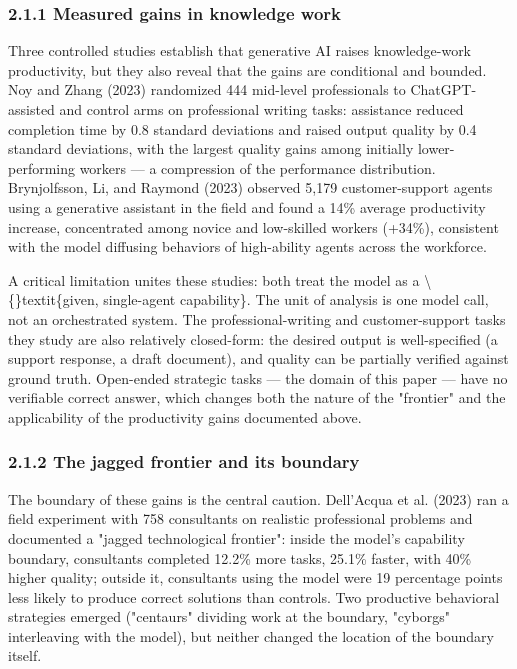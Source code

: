 \documentclass[11pt,a4paper]{article}
\begin{document}
\subsubsection{2.1.1 Measured gains in knowledge work}

Three controlled studies establish that generative AI raises knowledge-work
productivity, but they also reveal that the gains are conditional and
bounded. Noy and Zhang (2023) randomized 444 mid-level professionals to
ChatGPT-assisted and control arms on professional writing tasks: assistance
reduced completion time by 0.8 standard deviations and raised output quality
by 0.4 standard deviations, with the largest quality gains among initially
lower-performing workers — a compression of the performance distribution.
Brynjolfsson, Li, and Raymond (2023) observed 5,179 customer-support agents
using a generative assistant in the field and found a 14\% average
productivity increase, concentrated among novice and low-skilled workers
(+34\%), consistent with the model diffusing behaviors of high-ability agents
across the workforce.

A critical limitation unites these studies: both treat the model as a
\textbackslash\{\}textit\{given, single-agent capability\}. The unit of analysis is one model call,
not an orchestrated system. The professional-writing and customer-support
tasks they study are also relatively closed-form: the desired output is
well-specified (a support response, a draft document), and quality can be
partially verified against ground truth. Open-ended strategic tasks — the
domain of this paper — have no verifiable correct answer, which changes both
the nature of the "frontier" and the applicability of the productivity
gains documented above.

\subsubsection{2.1.2 The jagged frontier and its boundary}

The boundary of these gains is the central caution. Dell'Acqua et al.
(2023) ran a field experiment with 758 consultants on realistic professional
problems and documented a "jagged technological frontier": inside the model's
capability boundary, consultants completed 12.2\% more tasks, 25.1\% faster,
with 40\% higher quality; outside it, consultants using the model were 19
percentage points less likely to produce correct solutions than controls.
Two productive behavioral strategies emerged ("centaurs" dividing work at
the boundary, "cyborgs" interleaving with the model), but neither changed
the location of the boundary itself.
\end{document}
